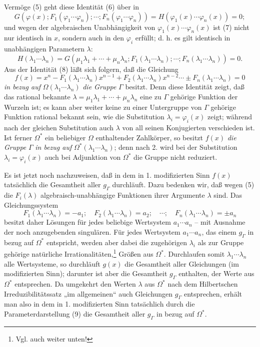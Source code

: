 \documentclass[11pt]{article}
\begin{document}
Vermöge (5) geht diese Identität (6) über in
\begin{equation}
G(\varphi(x);F_1(\varphi_1\cdots\varphi_n);\cdots;F_n(\varphi_1\cdots\varphi_n))
=H(\varphi_1(x)\cdots\varphi_n(x))=0;
\tag{7}
\end{equation}
und wegen der algebraischen Unabhängigkeit von $\varphi_1(x)\cdots\varphi_n(x)$ ist (7) nicht nur identisch in $x$, sondern auch in den $\varphi_i$ erfüllt; d. h. es gilt identisch in unabhängigen Parametern $\lambda$:
\begin{equation}
H(\lambda_1\cdots\lambda_n)=G(\mu_1\lambda_1+\cdots+\mu_n\lambda_n;F_1(\lambda_1\cdots\lambda_n);\cdots;F_n(\lambda_1\cdots\lambda_n))=0.
\tag{8}
\end{equation}
Aus der Identität (8) läßt sich folgern, daß die Gleichung
\begin{equation}
f(x)=x^n-F_1(\lambda_1\cdots\lambda_n)x^{n-1}+F_2(\lambda_1\cdots\lambda_n)x^{n-2}\cdots\pm F_n(\lambda_1\cdots\lambda_n)=0
\tag{9}
\end{equation}
\emph{in bezug auf} $\Omega(\lambda_1\cdots\lambda_n)$ \emph{die Gruppe} $\Gamma$ besitzt. Denn diese Identität zeigt, daß das rational bekannte $\lambda=\mu_1\lambda_1+\cdots+\mu_n\lambda_n$ eine zu $\Gamma$ gehörige Funktion der Wurzeln ist; es kann aber weiter keine zu einer Untergruppe von $\Gamma$ gehörige Funktion rational bekannt sein, wie die Substitution $\lambda_i=\varphi_i(x)$ zeigt; während nach der gleichen Substitution auch $\lambda$ von all seinen Konjugierten verschieden ist. Ist ferner $\Omega^*$ ein beliebiger $\Omega$ enthaltender Zahlkörper, so besitzt $f(x)$ \emph{die Gruppe} $\Gamma$ \emph{in bezug auf} $\Omega^*(\lambda_1\cdots\lambda_n)$; denn nach 2. wird bei der Substitution $\lambda_i=\varphi_i(x)$ auch bei Adjunktion von $\Omega^*$ die Gruppe nicht reduziert.

Es ist jetzt noch nachzuweisen, daß in dem in 1. modifizierten Sinn $f(x)$ tatsächlich die Gesamtheit aller $g_\Gamma$ durchläuft. Dazu bedenken wir, daß wegen (5) die $F_i(\lambda)$ algebraisch-unabhängige Funktionen ihrer Argumente $\lambda$ sind. Das Gleichungssystem
\begin{equation}
F_1(\lambda_1\cdots\lambda_n)=-a_1;\quad F_2(\lambda_1\cdots\lambda_n)=a_2;\quad \cdots;\quad F_n(\lambda_1\cdots\lambda_n)=\pm a_n
\tag{10}
\end{equation}
besitzt daher Lösungen für jedes beliebige Wertsystem $a_1\cdots a_n$ -- mit Ausnahme der noch anzugebenden singulären. Für jedes Wertsystem $a_1\cdots a_n$, das einem $g_\Gamma$ in bezug auf $\Omega^*$ entspricht, werden aber dabei die zugehörigen $\lambda_i$ als zur Gruppe gehörige natürliche Irrationalitäten,\footnote{Vgl. auch weiter unten!} Größen aus $\Omega^*$. Durchlaufen somit $\lambda_1\cdots\lambda_n$ alle Wertsysteme, so durchläuft $g(x)$ die Gesamtheit aller Gleichungen (im modifizierten Sinn); darunter ist aber die Gesamtheit $g_\Gamma$ enthalten, der Werte aus $\Omega^*$ entsprechen. Da umgekehrt den Werten $\lambda$ aus $\Omega^*$ nach dem Hilbertschen Irreduzibilitätssatz „im allgemeinen“ auch Gleichungen $g_\Gamma$ entsprechen, erhält man also in dem in 1. modifizierten Sinn tatsächlich durch die Parameterdarstellung (9) die Gesamtheit aller $g_\Gamma$ in bezug auf $\Omega^*$.
\end{document}
